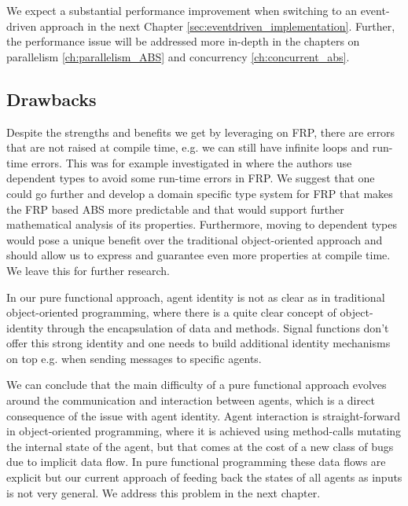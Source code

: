 We expect a substantial performance improvement when switching to an event-driven approach \cite{meyer_event-driven_2014} in the next Chapter \ref{sec:eventdriven_implementation}. Further, the performance issue will be addressed more in-depth in the chapters on parallelism \ref{ch:parallelism_ABS} and concurrency \ref{ch:concurrent_abs}.

\subsection{Drawbacks}
Despite the strengths and benefits we get by leveraging on FRP, there are errors that are not raised at compile time, e.g. we can still have infinite loops and run-time errors. This was for example investigated in \cite{sculthorpe_safe_2009} where the authors use dependent types to avoid some run-time errors in FRP. We suggest that one could go further and develop a domain specific type system for FRP that makes the FRP based ABS more predictable and that would support further mathematical analysis of its properties. Furthermore, moving to dependent types would pose a unique benefit over the traditional object-oriented approach and should allow us to express and guarantee even more properties at compile time. We leave this for further research.

In our pure functional approach, agent identity is not as clear as in traditional object-oriented programming, where there is a quite clear concept of object-identity through the encapsulation of data and methods. Signal functions don't offer this strong identity and one needs to build additional identity mechanisms on top e.g. when sending messages to specific agents.

We can conclude that the main difficulty of a pure functional approach evolves around the communication and interaction between agents, which is a direct consequence of the issue with agent identity. Agent interaction is straight-forward in object-oriented programming, where it is achieved using method-calls mutating the internal state of the agent, but that comes at the cost of a new class of bugs due to implicit data flow. In pure functional programming these data flows are explicit but our current approach of feeding back the states of all agents as inputs is not very general. We address this problem in the next chapter.